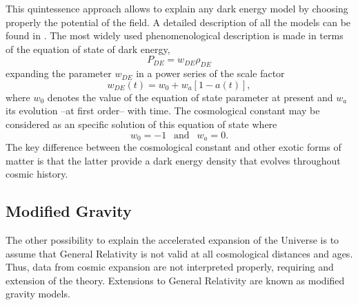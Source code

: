 This quintessence approach allows to explain any dark energy model by choosing properly the potential of the field. A detailed description of all the models can be found in \cite{2010deto.book.....A}. The most widely used phenomenological description is made in terms of the equation of state of dark energy,
\begin{equation}
P_{DE} = w_{DE}\rho_{DE}
\end{equation}
expanding the parameter $w_{DE}$ in a power series of the scale factor
\begin{equation}
w_{DE}(t) = w_0 +w_a[1-a(t)],
\end{equation}
where $w_0$ denotes the value of the equation of state parameter at present and $w_a$ its evolution --at first order-- with time. The cosmological constant may be considered as an specific solution of this equation of state where
\begin{equation}
w_0=-1\ \ \mbox{ and }\ \ w_a=0.
\end{equation}
The key difference between the cosmological constant and other exotic forms of matter is that the latter provide a dark energy density that evolves throughout cosmic history.

\subsection{Modified Gravity}
The other possibility to explain the accelerated expansion of the Universe is to assume that General Relativity is not valid at all cosmological distances and ages. Thus, data from cosmic expansion are not interpreted properly, requiring and extension of the theory.  Extensions to General Relativity are known as modified gravity models.
\newline

